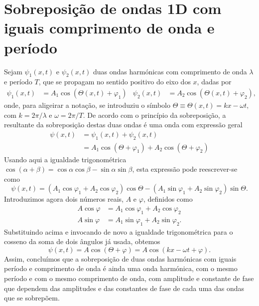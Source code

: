 \section{Sobreposição de ondas 1D com iguais comprimento de onda e período}
\label{sec:sobrpos}
Sejam $\psi_1(x,t)$ e $\psi_2(x,t)$ duas ondas harmónicas com comprimento de
onda $\lambda$ e período $T$, que se propagam no sentido positivo do eixo dos
$x$, dadas por
\begin{align*}
\psi_1(x,t)&=A_1\cos\left(\Theta(x,t)+\varphi_1\right)&
\psi_2(x,t)&=A_2\cos\left(\Theta(x,t)+\varphi_2\right),
\end{align*}
onde, para aligeirar a notação, se introduziu o símbolo
$\Theta\equiv\Theta(x,t)=kx-\omega t,$ com $k=2\pi/\lambda$ e $\omega=2\pi/T$.
De acordo com o princípio da sobreposição, a resultante da sobreposição destas
duas ondas é uma onda com expressão geral
\begin{align*}
\psi(x,t)&=\psi_1(x,t)+\psi_2(x,t)\\
&=A_1\cos(\Theta+\varphi_1)+A_2\cos(\Theta+\varphi_2)
\end{align*}
Usando aqui a igualdade trigonométrica
$\cos(\alpha+\beta)=\cos\alpha\cos\beta-\sin\alpha\sin\beta$, esta expressão
pode reescrever-se como
\begin{equation*}
\psi(x,t)=(A_1\cos\varphi_1+A_2\cos\varphi_2)\cos\Theta-
(A_1\sin\varphi_1+A_2\sin\varphi_2)\sin\Theta.
\end{equation*}
Introduzimos agora dois números reais, $A$ e $\varphi$, definidos como
\begin{align*}
A\cos\varphi&=A_1\cos\varphi_1+A_2\cos\varphi_2\\
A\sin\varphi&=A_1\sin\varphi_1+A_2\sin\varphi_2.
\end{align*}
Substituindo acima e invocando de novo a igualdade trigonométrica para o cosseno
da soma de dois ângulos já usada, obtemos
\begin{equation}
\psi(x,t)=A\cos\left(\Theta+\varphi\right)=
A\cos\left(kx-\omega t+\varphi\right).
\end{equation}
Assim, concluímos que a sobreposição de duas ondas harmónicas com iguais período
e comprimento de onda é ainda uma onda harmónica, com o mesmo período e com o
mesmo comprimento de onda, com amplitude e constante de fase que dependem das
amplitudes e das constantes de fase de cada uma das ondas que se sobrepõem.


